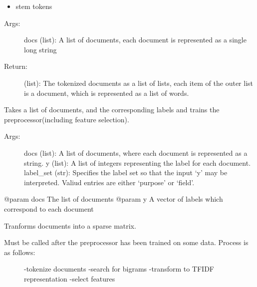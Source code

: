 \documentclass[letterpaper,10pt,english]{sphinxmanual}
\begin{document}
\begin{fulllineitems}
\begin{fulllineitems}
\begin{itemize}
\item {} 
stem tokens

\end{itemize}
\begin{description}
\item[{Args:}] \leavevmode
docs (list): A list of documents, each document is represented as a single long string

\item[{Return:}] \leavevmode
(list): The tokenized documents as a list of lists, each item of the outer list is a document, which is represented as a list of words.

\end{description}

\end{fulllineitems}


\begin{fulllineitems}
\label{\detokenize{KUHERD:KUHERD.HerdVectorizer.HerdVectorizer.train}}
Takes a list of documents, and the corresponding labels and trains the preprocessor(including feature selection).
\begin{description}
\item[{Args:}] \leavevmode
docs (list): A list of documents, where each document is represented as a string.
y (list): A list of integers representing the label for each document.
label\_set (str): Specifies the label set so that the input `y' may be interpreted. Valiud entries are either `purpose' or `field'.

\end{description}

@param docs The list of documents
@param y A vector of labels which correspond to each document

\end{fulllineitems}


\begin{fulllineitems}
\label{\detokenize{KUHERD:KUHERD.HerdVectorizer.HerdVectorizer.transform_data}}
Tranforms documents into a sparse matrix.
\begin{description}
\item[{Must be called after the preprocessor has been trained on some data. Process is as follows:}] \leavevmode
-tokenize documents
-search for bigrams
-transform to TFIDF representation
-select features


\end{description}
\end{fulllineitems}
\end{fulllineitems}
\end{document}
